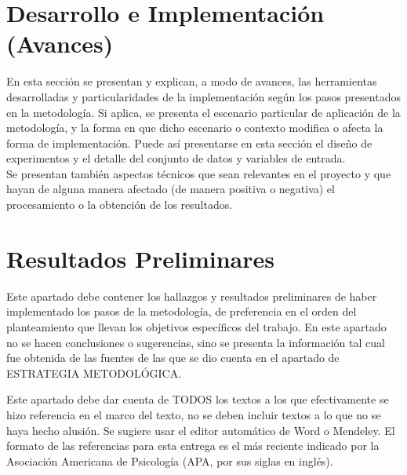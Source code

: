 \documentclass[spanish, letterpaper, 12pt]{book}
\begin{document}
\chapter{Desarrollo e Implementación (Avances)}
En esta sección se presentan y explican, a modo de avances, las herramientas desarrolladas y particularidades de la implementación según los pasos presentados en la metodología. Si aplica, se presenta el escenario particular de aplicación de la metodología, y la forma en que dicho escenario o contexto modifica o afecta la forma de implementación. Puede así presentarse en esta sección el diseño de experimentos y el detalle del conjunto de datos y variables de entrada.\\
Se presentan también aspectos técnicos que sean relevantes en el proyecto y que hayan de alguna manera afectado (de manera positiva o negativa) el procesamiento o la obtención de los resultados.


\chapter{Resultados Preliminares}
Este apartado debe contener los hallazgos y resultados preliminares de haber implementado los pasos de la metodología, de preferencia en el orden del planteamiento que llevan los objetivos específicos del trabajo. En este apartado no se hacen conclusiones o sugerencias, sino se presenta la información tal cual fue obtenida de las fuentes de las que se dio cuenta en el apartado de ESTRATEGIA METODOLÓGICA.

\backmatter



Este apartado debe dar cuenta de TODOS los textos a los que efectivamente se hizo referencia en el marco del texto, no se deben incluir textos a lo que no se haya hecho alusión. Se sugiere usar el editor automático de Word o Mendeley. El formato de las referencias para esta entrega es el más reciente indicado por la Asociación Americana de Psicología (APA, por sus siglas en inglés).
\end{document}
